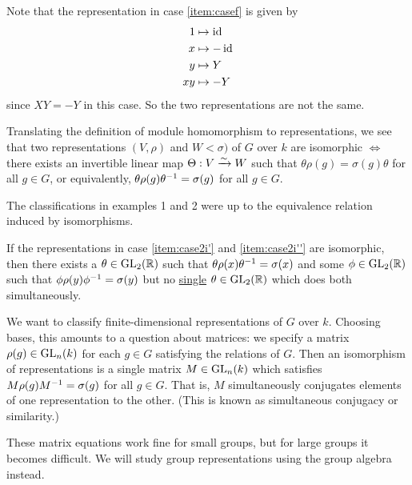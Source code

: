 \begin{exam}
\begin{enum}
\begin{enum}
\begin{enum}
				Note that the representation in case \ref{item:casef} is given by
				\begin{align*}
					1 &\mapsto \operatorname{id} \\
					x &\mapsto -\operatorname{id} \\
					y &\mapsto Y \\
					xy &\mapsto -Y
				\end{align*}
				since $XY=-Y$ in this case.
				So the two representations are not the same.
			\end{enum}
		\end{enum}
	\end{enum}
\end{exam}

\begin{rmk}
	Translating the definition of module homomorphism to representations, we see that two representations $(V,\rho)$ and $W<\sigma)$ of $G$ over $k$ are isomorphic $\iff$ there exists an invertible linear map $\Theta:V \xrightarrow{\sim} W$ such that $\theta\rho(g)=\sigma(g)\theta$ for all $g \in G$, or equivalently, $\theta\rho(g)\theta^{-1}=\sigma(g)$ for all $g \in G$.
\end{rmk}

\begin{rmk}
	The classifications in examples 1 and 2 were up to the equivalence relation induced by isomorphisms.
	
	If the representations in case \ref{item:case2i'} and \ref{item:case2i''} are isomorphic, then there exists a $\theta \in \operatorname{GL}_2(\mathbb{R})$ such that $\theta\rho(x)\theta^{-1} = \sigma(x)$ and some $\phi \in \operatorname{GL}_2(\mathbb{R})$ such that $\phi\rho(y)\phi^{-1}=\sigma(y)$ but no \underline{single} $\theta \in \operatorname{GL}_2(\mathbb{R})$ which does both simultaneously.	
\end{rmk}

\begin{rmk}
	We want to classify finite-dimensional representations of $G$ over $k$.
	Choosing bases, this amounts to a question about matrices: we specify a matrix $\rho(g) \in \operatorname{GL}_n(k)$ for each $g \in G$ satisfying the relations of $G$.
	Then an isomorphism of representations is a single matrix $M \in \operatorname{GL}_n(k)$ which satisfies $M\rho(g)M^{-1}=\sigma(g)$ for all $g \in G$.
	That is, $M$ simultaneously conjugates elements of one representation to the other.
	(This is known as simultaneous conjugacy or similarity.)
	
	These matrix equations work fine for small groups, but for large groups it becomes difficult.
	We will study group representations using the group algebra instead.
\end{rmk}
